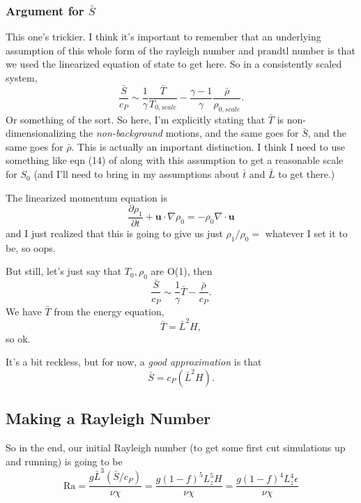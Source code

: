 \documentclass[aps, pre, onecolumn, nofootinbib, notitlepage, groupedaddress, amsfonts, amssymb, amsmath, longbibliography]{revtex4-1}
\newcommand{\grad}{\ensuremath{\nabla}}
\begin{document}
\subsubsection{Argument for $\bar{S}$}
This one's trickier.  I think it's important to remember that an underlying assumption of
this whole form of the rayleigh number and prandtl number is that we used the linearized equation
of state to get here.  So in a consistently scaled system,
$$
\frac{\bar{S}}{c_P} \sim \frac{1}{\gamma}\frac{\bar{T}}{T_{0, scale}} - \frac{\gamma-1}{\gamma}\frac{\bar{\rho}}{\rho_{0, scale}}.
$$
Or something of the sort.  So here, I'm explicitly stating that $\bar{T}$ is non-dimensionalizing the
\emph{non-background} motions, and the same goes for $\bar{S}$, and the same goes for $\bar{\rho}$. 
This is actually an important distinction. I think I need to use something like eqn (14) of
\cite{brown&all2012} along with this assumption to get a reasonable scale for $S_0$
(and I'll need to bring in my assumptions about $\bar{t}$ and $\bar{L}$ to get there.)

The linearized momentum equation \citep{brown&all2012} is
\begin{equation}
\frac{\partial \rho_1}{\partial t} + \bm{u}\cdot\grad\rho_0 = -\rho_0 \grad\cdot\bm{u}
\end{equation}
and I just realized that this is going to give us just $\rho_1/\rho_0 = $ whatever I set
it to be, so oops.

But still, let's just say that $T_0, \rho_0$ are O(1), then
$$
\frac{\bar{S}}{c_P} \sim \frac{1}{\gamma}\bar{T} - \frac{\bar{\rho}}{c_P}.
$$
We have $\bar{T}$ from the energy equation,
$$
\bar{T} = \bar{L}^2 H,
$$
so ok.

It's a bit reckless, but for now, a \emph{good approximation} is that
\begin{equation}
\bar{S} = c_P(\bar{L}^2 H).
\end{equation}

\subsection{Making a Rayleigh Number}
So in the end, our initial Rayleigh number (to get some first cut simulations up and running)
is going to be
\begin{equation}
\boxed{
\text{Ra} = \frac{g \bar{L}^3 (\bar{S}/c_P)}{\nu\chi} = \frac{g (1 - f)^5 L_z^5 H}{\nu\chi} = 
\frac{g (1 - f)^4 L_z ^4 \epsilon }{\nu\chi}}
\end{equation}



\end{document}
